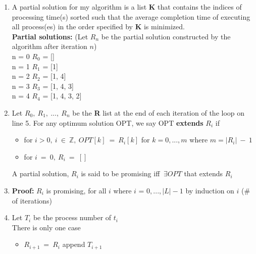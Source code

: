 \documentclass[11pt,twoside]{article}
\begin{document}
\begin{enumerate}[leftmargin=0pt,label=(\alph*)]
\begin{enumerate}[leftmargin=10pt,label=\arabic*]
    \item\hspace{2mm} \hspace{5mm} \hspace{5mm} \hspace{5mm} {\bf break} \hspace{18mm}{\scshape //this occurrence in L}
    \item\hspace{2mm}{\bf return} R 

    \end{enumerate}
\item A partial solution for my algorithm is a list {\bf K} that contains the indices of processing time(s) sorted such that the average completion time of executing all process(es) in the order specified by {\bf K} is minimized.\\
{\bf Partial solutions:} (Let $R_{n}$ be the partial solution constructed by the algorithm after iteration $n$) \\
n = 0 \hspace{5mm} $R_{0}$ = []\\
n = 1 \hspace{5mm} $R_{1}$ = [1]\\
n = 2 \hspace{5mm} $R_{2}$ = [1, 4]\\
n = 3 \hspace{5mm} $R_{3}$ = [1, 4, 3]\\
n = 4 \hspace{5mm} $R_{4}$ = [1, 4, 3, 2]\\

\item Let $R_{0},\ R_{1},\ ...,\ R_{n}$ be the {\bf R} list at the end of each iteration of the loop on line 5. For any optimum solution OPT, we say OPT {\bf extends} $R_{i}$ if
    \begin{itemize}
    \item for $i>0,\ i\ \in\ \mathbb{Z},\ OPT[k]\ =\ R_{i}[k]$ for $k=0,...,m$ where $m=|R_{i}|\ -\ 1$
    \item for $i\ =\ 0,\ R_{i}\ =\ []$
    \end{itemize}
A partial solution, $R_{i}$ is said to be promising iff $\ \exists OPT$ that extends $R_{i}$

\item {\bf Proof:} $R_{i}$ is promising, for all $i$ where $i$ = $0,...,|L|-1$ by induction on $i$ (\# of iterations)

\item Let $T_{i}$ be the process number of $t_{i}$\\
There is only one case
    \begin{itemize}
    \item $R_{i+1}\ =\ R_{i}$ append $T_{i+1}$
    \end{itemize}
\end{enumerate}
\end{document}
